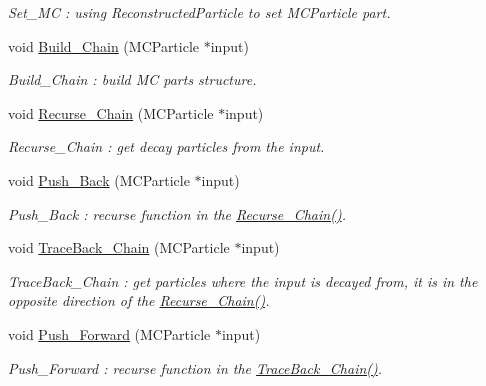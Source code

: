 \begin{DoxyCompactItemize}
\begin{DoxyCompactList}\small\item\em Set\_\-MC : using ReconstructedParticle to set MCParticle part. \item\end{DoxyCompactList}\item 
void \hyperlink{classToolSet_1_1CChain__Single_a8c4a654be35090013cb5923de100b1bf}{Build\_\-Chain} (MCParticle $\ast$input)
\begin{DoxyCompactList}\small\item\em Build\_\-Chain : build MC parts structure. \item\end{DoxyCompactList}\item 
void \hyperlink{classToolSet_1_1CChain__Single_a6e24f84cd12c38d28f4e154f547d4170}{Recurse\_\-Chain} (MCParticle $\ast$input)
\begin{DoxyCompactList}\small\item\em Recurse\_\-Chain : get decay particles from the input. \item\end{DoxyCompactList}\item 
void \hyperlink{classToolSet_1_1CChain__Single_a5aa8017f2147e06c959f3a296bc3af3b}{Push\_\-Back} (MCParticle $\ast$input)
\begin{DoxyCompactList}\small\item\em Push\_\-Back : recurse function in the \hyperlink{classToolSet_1_1CChain__Single_a6e24f84cd12c38d28f4e154f547d4170}{Recurse\_\-Chain()}. \item\end{DoxyCompactList}\item 
void \hyperlink{classToolSet_1_1CChain__Single_a8f0623cb1122dc17a82f3b86289b9681}{TraceBack\_\-Chain} (MCParticle $\ast$input)
\begin{DoxyCompactList}\small\item\em TraceBack\_\-Chain : get particles where the input is decayed from, it is in the opposite direction of the \hyperlink{classToolSet_1_1CChain__Single_a6e24f84cd12c38d28f4e154f547d4170}{Recurse\_\-Chain()}. \item\end{DoxyCompactList}\item 
void \hyperlink{classToolSet_1_1CChain__Single_ad261fc82205fec60d46ccda275256fe3}{Push\_\-Forward} (MCParticle $\ast$input)
\begin{DoxyCompactList}\small\item\em Push\_\-Forward : recurse function in the \hyperlink{classToolSet_1_1CChain__Single_a8f0623cb1122dc17a82f3b86289b9681}{TraceBack\_\-Chain()}. \item\end{DoxyCompactList}\item 

\end{DoxyCompactItemize}
